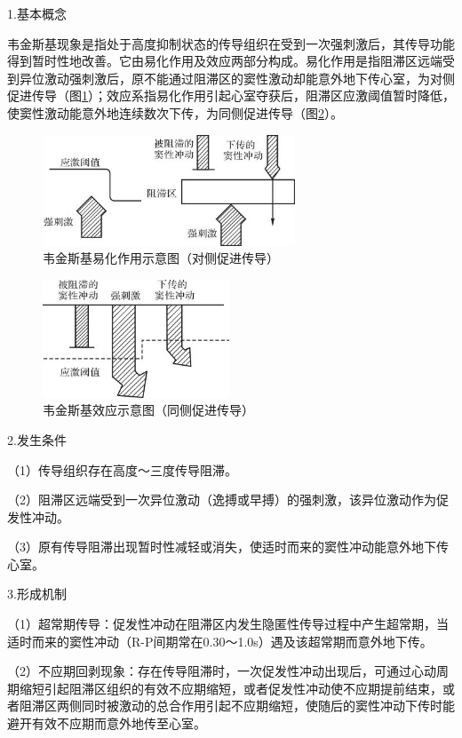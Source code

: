 1.基本概念

韦金斯基现象是指处于高度抑制状态的传导组织在受到一次强刺激后，其传导功能得到暂时性地改善。它由易化作用及效应两部分构成。易化作用是指阻滞区远端受到异位激动强刺激后，原不能通过阻滞区的窦性激动却能意外地下传心室，为对侧促进传导（图\ref{fig28-1}）；效应系指易化作用引起心室夺获后，阻滞区应激阈值暂时降低，使窦性激动能意外地连续数次下传，为同侧促进传导（图\ref{fig28-2}）。

\begin{figure}[!htbp]
 \centering
 \includegraphics[width=2.96875in,height=1.30208in]{./images/Image00461.jpg}
 \captionsetup{justification=centering}
 \caption{韦金斯基易化作用示意图（对侧促进传导）}
 \label{fig28-1}
  \end{figure} 

\begin{figure}[!htbp]
 \centering
 \includegraphics[width=2.1875in,height=1.38542in]{./images/Image00462.jpg}
 \captionsetup{justification=centering}
 \caption{韦金斯基效应示意图（同侧促进传导）}
 \label{fig28-2}
  \end{figure} 

2.发生条件

（1）传导组织存在高度～三度传导阻滞。

（2）阻滞区远端受到一次异位激动（逸搏或早搏）的强刺激，该异位激动作为促发性冲动。

（3）原有传导阻滞出现暂时性减轻或消失，使适时而来的窦性冲动能意外地下传心室。

3.形成机制

（1）超常期传导：促发性冲动在阻滞区内发生隐匿性传导过程中产生超常期，当适时而来的窦性冲动（R-P间期常在0.30～1.0s）遇及该超常期而意外地下传。

（2）不应期回剥现象：存在传导阻滞时，一次促发性冲动出现后，可通过心动周期缩短引起阻滞区组织的有效不应期缩短，或者促发性冲动使不应期提前结束，或者阻滞区两侧同时被激动的总合作用引起不应期缩短，使随后的窦性冲动下传时能避开有效不应期而意外地传至心室。

